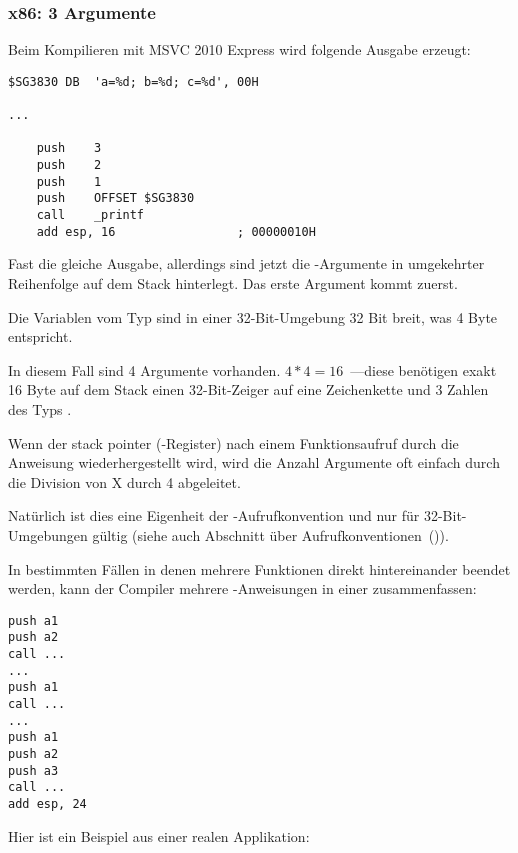 \subsubsection{x86: 3 Argumente}


Beim Kompilieren mit MSVC 2010 Express wird folgende Ausgabe erzeugt:

\begin{lstlisting}[style=customasmx86]
$SG3830	DB	'a=%d; b=%d; c=%d', 00H

...

	push	3
	push	2
	push	1
	push	OFFSET $SG3830
	call	_printf
	add	esp, 16					; 00000010H
\end{lstlisting}

Fast die gleiche Ausgabe, allerdings sind jetzt die \printf-Argumente in umgekehrter Reihenfolge
auf dem Stack hinterlegt. Das erste Argument kommt zuerst.

Die Variablen vom Typ \Tint sind in einer 32-Bit-Umgebung 32 Bit breit, was 4 Byte entspricht.

In diesem Fall sind 4 Argumente vorhanden. $4*4 = 16$~---diese benötigen exakt 16 Byte auf dem Stack
einen 32-Bit-Zeiger auf eine Zeichenkette und 3 Zahlen des Typs \Tint.

Wenn der \gls{stack pointer} (\ESP-Register) nach einem Funktionsaufruf durch die Anweisung
 wiederhergestellt wird, wird die Anzahl Argumente oft einfach durch
die Division von X durch 4 abgeleitet.

Natürlich ist dies eine Eigenheit der -Aufrufkonvention und nur für 32-Bit-Umgebungen gültig
(siehe auch Abschnitt über Aufrufkonventionen~()).

In bestimmten Fällen in denen mehrere Funktionen direkt hintereinander beendet werden, kann
der Compiler mehrere -Anweisungen in einer zusammenfassen:

\begin{lstlisting}[style=customasmx86]
push a1
push a2
call ...
...
push a1
call ...
...
push a1
push a2
push a3
call ...
add esp, 24
\end{lstlisting}

Hier ist ein Beispiel aus einer realen Applikation:



